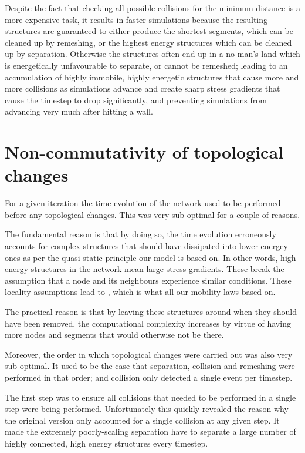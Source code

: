 Despite the fact that checking all possible collisions for the minimum distance is a more expensive task, it results in faster simulations because the resulting structures are guaranteed to either produce the shortest segments, which can be cleaned up by remeshing, or the highest energy structures which can be cleaned up by separation. Otherwise the structures often end up in a no-man's land which is energetically unfavourable to separate, or cannot be remeshed; leading to an accumulation of highly immobile, highly energetic structures that cause more and more collisions as simulations advance and create sharp stress gradients that cause the timestep to drop significantly, and preventing simulations from advancing very much after hitting a wall.

\section{Non-commutativity of topological changes}\label{s:nonCommutativity}
For a given iteration the time-evolution of the network used to be performed before any topological changes. This was very sub-optimal for a couple of reasons.

The fundamental reason is that by doing so, the time evolution erroneously accounts for complex structures that should have dissipated into lower energey ones as per the quasi-static principle our model is based on. In other words, high energy structures in the network mean large stress gradients. These break the assumption that a node and its neighbours experience similar conditions. These locality assumptions lead to \label{eq:nodeVel}, which is what all our mobility laws based on.

The practical reason is that by leaving these structures around when they should have been removed, the computational complexity increases by virtue of having more nodes and segments that would otherwise not be there.

Moreover, the order in which topological changes were carried out was also very sub-optimal. It used to be the case that separation, collision and remeshing were performed in that order; and collision only detected a single event per timestep.

The first step was to ensure all collisions that needed to be performed in a single step were being performed. Unfortunately this quickly revealed the reason why the original version only accounted for a single collision at any given step. It made the extremely poorly-scaling separation have to separate a large number of highly connected, high energy structures every timestep.

